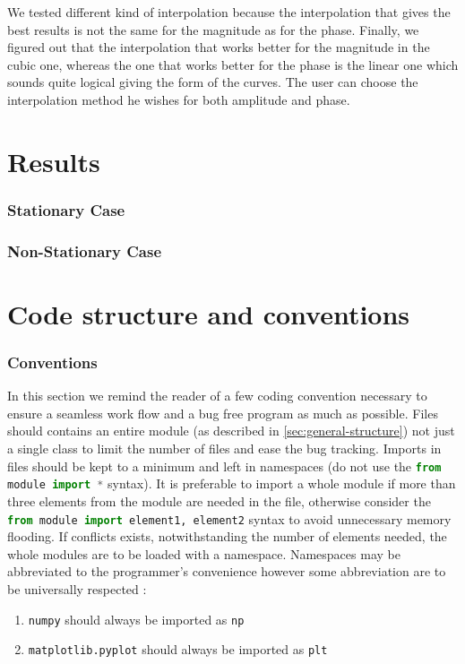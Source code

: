 \documentclass[]{article}
\begin{document}
We tested different kind of interpolation because the interpolation that gives the best results is not the same for the magnitude as for the phase. Finally, we figured out that the interpolation that works better for the magnitude in the cubic one, whereas the one that works better for the phase is the linear one which sounds quite logical giving the form of the curves. The user can choose the interpolation method he wishes for both amplitude and phase.



\newpage
\part{Results}
\section{Stationary Case}\label{sec:stationary-results}
\section{Non-Stationary Case}\label{non-stationary-results}

\newpage
\part{Code structure and conventions}\label{sec:code-structure-and-conventions}

\section{Conventions}\label{sec:conventions}

\hspace{15pt}In this section we remind the reader of a few coding convention necessary to ensure a seamless work flow and a bug free program as much as possible.
Files should contains an entire module (as described in \ref{sec:general-structure}) not just a single class to limit the number of files and ease the bug tracking.
Imports in files should be kept to a minimum and left in namespaces (do not use the \lstinline[columns=fixed,language=Python]|from module import *| syntax). It is preferable to import a whole module if more than three elements from the module are needed in the file, otherwise consider the \lstinline[columns=fixed,language=Python]|from module import element1, element2| syntax to avoid unnecessary memory flooding. If conflicts exists, notwithstanding the number of elements needed, the whole modules are to be loaded with a namespace.
Namespaces may be abbreviated to the programmer's convenience however some abbreviation are to be universally respected :
\begin{enumerate}[label=(\roman*)]
	\item \texttt{numpy} should always be imported as \texttt{np}
	\item \texttt{matplotlib.pyplot} should always be imported as \texttt{plt}
\end{enumerate}
\end{document}
